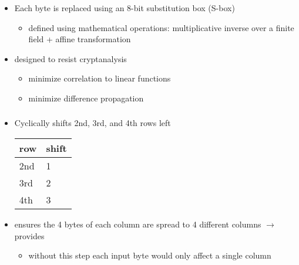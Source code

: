 \documentclass[draft]{article}
\begin{document}
\begin{multicols}{3}
    \subsubsection*{}
    \begin{itemize}[nosep]
        \item Each byte is replaced using an 8-bit substitution box (S-box)
              \begin{itemize}[nosep]
                  \item defined using mathematical operations: multiplicative inverse over a finite field + affine transformation
              \end{itemize}
        \item designed to resist cryptanalysis
              \begin{itemize}[nosep]
                  \item minimize correlation to linear functions
                  \item minimize difference propagation
              \end{itemize}
    \end{itemize}
    \subsubsection*{}
    \begin{itemize}[nosep]
        \item Cyclically shifts 2nd, 3rd, and 4th rows left

              \begin{tabular}{ll}
                  row & shift \\\toprule
                  2nd & 1     \\
                  3rd & 2     \\
                  4th & 3     \\\bottomrule
              \end{tabular}
        \item ensures the 4 bytes of each column are spread to 4 different columns $\rightarrow$ provides 
              \begin{itemize}[nosep]
                  \item without this step each input byte would only affect a single column
              \end{itemize}
    \end{itemize}

\end{multicols}
\end{document}
